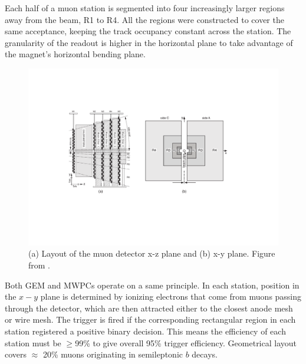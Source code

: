 
Each half of a muon station is segmented into four increasingly larger regions away from the beam, R1 to R4.
 All the regions were constructed to cover the same acceptance, keeping the track occupancy constant across the station. The granularity of the readout is higher in the horizontal plane to take advantage of the magnet's horizontal bending plane.




\begin{figure}[!h]
	\centering
	\includegraphics[width = 1.0\textwidth]{figs/detector/sideview.pdf}%
	\caption{(a) Layout of the muon detector x-z plane and (b) x-y plane. Figure from \cite{LHCb-DP-2012-002}. }  
	\label{fig:MuonGran}
\end{figure}

Both GEM and \Gls{MWPCs} operate on a same principle. In each station, position in the $x-y$ plane is determined by ionizing electrons that come from muons passing through the detector, which are then attracted either to the closest anode mesh or wire mesh. The trigger is fired if the corresponding rectangular region in each station registered a positive binary decision. This means the efficiency of each station must be $\geq$99\% to give overall 95\% trigger efficiency. Geometrical layout covers $\approx$ 20\% muons originating in semileptonic $b$ decays.


